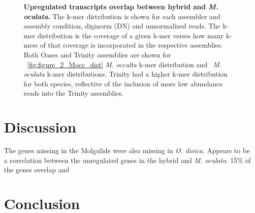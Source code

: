 \begin{figure}[!ht]
	\caption{\textbf{Upregulated transcripts overlap between hybrid and \textit{M. oculata}.} The k-mer distribution is shown for each assembler and assembly condition, diginorm (DN) and unnormalized reads. The k-mer distribution is the coverage of a given k-mer verses how many k-mers of that coverage is incorporated in the respective assemblies. Both Oases and Trinity assemblies are shown for ~\ref{fig:figure_2_Mocc_dist} \textit{M. occulta} k-mer distribution and  ~\textit{M. oculata} k-mer distributions. Trinity had a higher k-mer distribution for both species, reflective of the inclusion of more low abundance reads into the Trinity assemblies.}	
	\label{fig:upreg_tb}
\end{figure}

\section{Discussion}
The genes missing in the Molgulide were also missing in \textit{O. dioica}.
Appears to be a correlation between the unregulated genes in the hybrid and \textit{M. oculata}. 15\% of the genes overlap and 
\section{Conclusion}
